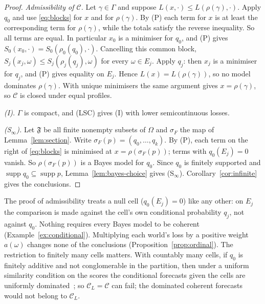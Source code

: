 \documentclass[11pt]{article}
\theoremstyle{definition}
\theoremstyle{remark}
\newcommand{\C}{\mathcal C}
\newcommand{\F}{\mathfrak F}
\newcommand{\supp}{\operatorname{supp}}
\begin{document}
\begin{proof}
\emph{Admissibility of $\C$.} Let $\gamma\in\Gamma$ and suppose $L(x,\cdot)\le L(\rho(\gamma),\cdot)$. Apply $q_0$ and use \eqref{eq:blocks} for $x$ and for $\rho(\gamma)$. By (P) each term for $x$ is at least the corresponding term for $\rho(\gamma)$, while the totals satisfy the reverse inequality. So all terms are equal. In particular $x_0$ is a minimiser for $q_0$, and (P) gives $S_0(x_0,\cdot)=S_0(\rho_0(q_0),\cdot)$. Cancelling this common block, $S_j(x_j,\omega)\le S_j(\rho_j(q_j),\omega)$ for every $\omega\in E_j$. Apply $q_j$: then $x_j$ is a minimiser for $q_j$, and (P) gives equality on $E_j$. Hence $L(x)=L(\rho(\gamma))$, so no model dominates $\rho(\gamma)$. With unique minimisers the same argument gives $x=\rho(\gamma)$, so $\C$ is closed under equal profiles.

\emph{(I).} $\Gamma$ is compact, and (LSC) gives (I) with lower semicontinuous losses.

\emph{(S$_\infty$).} Let $\F$ be all finite nonempty subsets of $\Omega$ and $\sigma_F$ the map of Lemma~\ref{lem:section}. Write $\sigma_F(p)=(q_0,\dots,q_k)$. By (P), each term on the right of \eqref{eq:blocks} is minimised at $x=\rho(\sigma_F(p))$; terms with $q_0(E_j)=0$ vanish. So $\rho(\sigma_F(p))$ is a Bayes model for $q_0$. Since $q_0$ is finitely supported and $\supp q_0\subseteq\supp p$, Lemma~\ref{lem:bayes-choice} gives (S$_\infty$). Corollary~\ref{cor:infinite} gives the conclusions.
\end{proof}
The proof of admissibility treats a null cell ($q_0(E_j)=0$) like any other: on $E_j$ the comparison is made against the cell's own conditional probability $q_j$, not against $q_0$. Nothing requires every Bayes model to be coherent (Example~\ref{ex:conditional}). Multiplying each world's loss by a positive weight $a(\omega)$ changes none of the conclusions (Proposition~\ref{prop:ordinal}). The restriction to finitely many cells matters. With countably many cells, if $q_0$ is finitely additive and not conglomerable in the partition, then under a uniform similarity condition on the scores the conditional forecasts given the cells are uniformly dominated~\cite[Theorem~2]{SSK14}; so $\C_L=\C$ can fail; the dominated coherent forecasts would not belong to $\C_L$.
\end{document}
